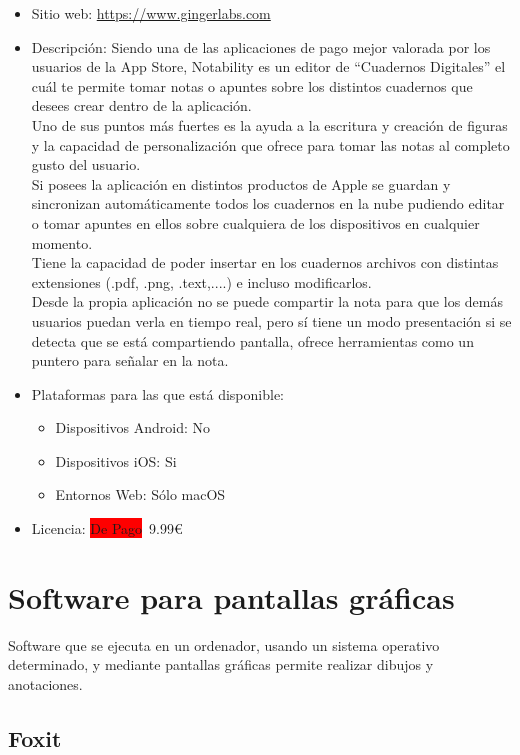 \documentclass[11pt]{article}
\newcommand{\pago}{\colorbox{Red}{De Pago}}
\begin{document}
\begin{itemize}
\item Sitio web: \url{https://www.gingerlabs.com}
\item Descripción: Siendo una de las aplicaciones de pago mejor valorada por los usuarios de la App Store, Notability es un editor de ``Cuadernos Digitales'' el cuál te permite tomar notas o apuntes sobre los distintos cuadernos que desees crear dentro de la aplicación.
\\
Uno de sus puntos más fuertes es la ayuda a la escritura y creación de figuras y la capacidad de personalización que ofrece para tomar las notas al completo gusto del usuario.
\\
Si posees la aplicación en distintos productos de Apple se guardan y sincronizan automáticamente todos los cuadernos en la nube pudiendo editar o tomar apuntes en ellos sobre cualquiera de los dispositivos en cualquier momento.
\\
Tiene la capacidad de poder insertar en los cuadernos archivos con distintas extensiones (.pdf, .png, .text,....) e incluso modificarlos.
\\
Desde la propia aplicación no se puede compartir la nota para que los demás usuarios puedan verla en tiempo real, pero sí tiene un modo presentación si se detecta que se está compartiendo pantalla, ofrece herramientas como un puntero para señalar en la nota.
\item Plataformas para las que está disponible:
  \begin{itemize}
  \item Dispositivos Android: No
  \item Dispositivos iOS: Si
  \item Entornos Web: Sólo macOS
  \end{itemize}
\item Licencia: \pago  \ 9.99\euro
\end{itemize}

\newpage

\section{Software para pantallas gráficas}

Software que se ejecuta en un ordenador, usando un sistema operativo
determinado, y mediante pantallas gráficas permite realizar dibujos y
anotaciones.

\subsection{Foxit}
\end{document}
